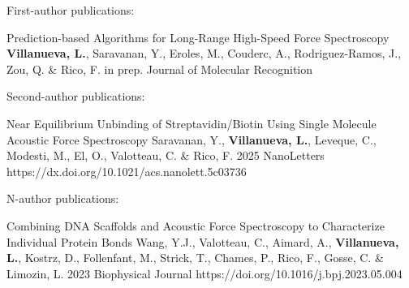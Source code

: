 
\begin{cvpublications}{First-author publications:}

	{Prediction-based Algorithms for Long-Range High-Speed Force Spectroscopy}
	{\textbf{Villanueva, L.}, Saravanan, Y., Eroles, M., Couderc, A., Rodriguez-Ramos, J., Zou, Q. \& Rico, F.}
	{in prep.}
    {Journal of Molecular Recognition}
    {}



\end{cvpublications}

\begin{cvpublications}{Second-author publications:}

	{Near Equilibrium Unbinding of Streptavidin/Biotin Using Single Molecule Acoustic Force Spectroscopy}
	{Saravanan, Y., \textbf{Villanueva, L.}, Leveque, C., Modesti, M., El, O., Valotteau, C. \& Rico, F.}
	{2025}
    {NanoLetters}
	{https://dx.doi.org/10.1021/acs.nanolett.5c03736}



\end{cvpublications}

\begin{cvpublications}{N-author publications:}

	{Combining DNA Scaffolds and Acoustic Force Spectroscopy to Characterize Individual Protein Bonds}
	{Wang, Y.J., Valotteau, C., Aimard, A., \textbf{Villanueva, L.}, Kostrz, D., Follenfant, M., Strick, T., Chames, P., Rico, F., Gosse, C. \& Limozin, L.}
	{2023}
	{Biophysical Journal}
	{https://doi.org/10.1016/j.bpj.2023.05.004}

\end{cvpublications}
